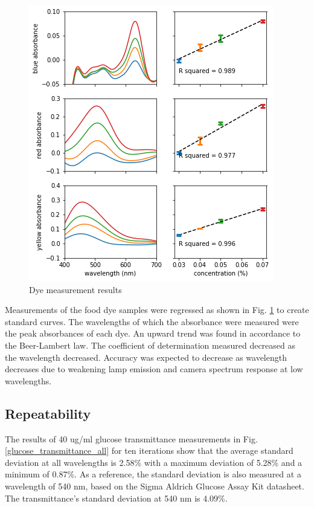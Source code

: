 \documentclass[conference]{IEEEtran}
\begin{document}
\begin{figure}[htbp]
    \centerline{\includegraphics[scale=0.6]{dye-res.png}}

    \caption{Dye measurement results}
    \label{dye_res}
    \end{figure}

Measurements of the food dye samples were regressed as shown in Fig. \ref{dye_res} to create standard curves.
The wavelengths of which the absorbance were measured were the peak absorbances of each dye.
An upward trend was found in accordance to the Beer-Lambert law.
The coefficient of determination measured decreased as the wavelength decreased.
Accuracy was expected to decrease as wavelength decreases due to weakening lamp emission and camera spectrum response at low wavelengths.

\subsection{Repeatability}

The results of 40 ug/ml glucose transmittance measurements in Fig. \ref{glucose_transmittance_all} for ten iterations show that the average standard deviation at all wavelengths is 2.58\% with a maximum deviation of 5.28\% and a minimum of 0.87\%.
As a reference, the standard deviation is also measured at a wavelength of 540 nm, based on the Sigma Aldrich Glucose Assay Kit datasheet.
The transmittance's standard deviation at 540 nm is 4.09\%. 
\end{document}
